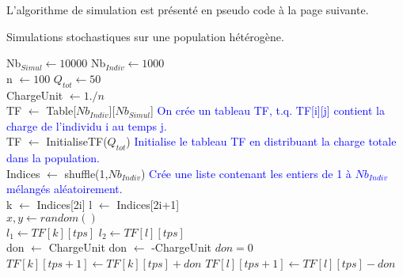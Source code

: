 L'algorithme de simulation est présenté en pseudo code à la page suivante. \\

\pagebreak

\begin{algorithm}
\caption{Simulations stochastiques sur une population hétérogène.}
\begin{algorithmic}

\State Nb$_{Simul} \gets 10000$
\State Nb$_{Indiv} \gets 1000$\\

\State n $\gets 100$
\State $Q_{tot} \gets 50$\\

\State ChargeUnit $\gets 1./n$\\


\State TF $\gets$ Table[$Nb_{Indiv}$][$Nb_{Simul}$]
\State \textcolor{blue}{On crée un tableau TF, t.q. TF[i][j] contient la charge de l'individu i au temps j.}\\
\State TF $\gets$ InitialiseTF($Q_{tot}$)
\State \textcolor{blue}{Initialise le tableau TF en distribuant la charge totale dans la population.}\\

	\State Indices $\gets$ shuffle(1,$Nb_{Indiv}$) 
	\State \textcolor{blue}{Crée une liste contenant les entiers de 1 à $Nb_{Indiv}$ mélangés aléatoirement.}\\
		\State k $\gets$ Indices[2i]
		\State l $\gets$ Indices[2i+1] \\
		
		\State $x,y \gets random()$\\
		
		\State $l_1 \gets TF[k][tps]$
		\State $l_2 \gets TF[l][tps]$\\
		
			\State don $\gets$ ChargeUnit 
			\State don $\gets$ -ChargeUnit 
		\Else
			\State $don=0$
		\EndIf \\
		
		\State $TF[k][tps+1] \gets TF[k][tps]+don$
        \State $TF[l][tps+1] \gets TF[l][tps]-don$\\
	\EndFor
\EndFor



\end{algorithmic}
\end{algorithm}

